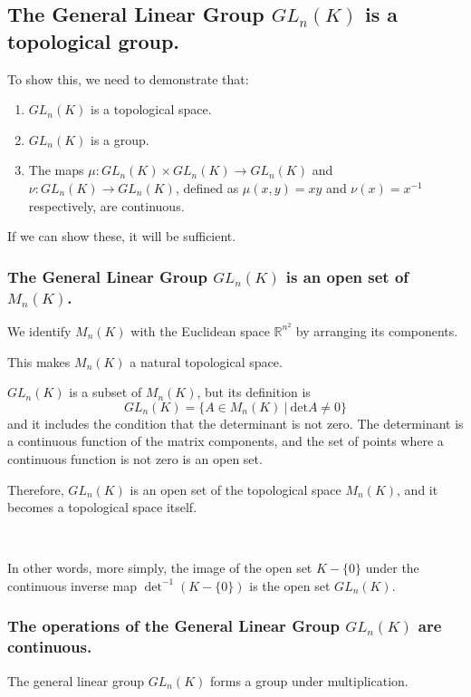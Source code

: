 \documentclass[uplatex,a4j,12pt,dvipdfmx]{jsarticle}
\begin{document}
\subsection{\textbf{The General Linear Group $GL_{n}(K)$ is a topological group.}}



To show this, we need to demonstrate that:

\begin{enumerate}
	\item $GL_{n}(K)$ is a topological space.
	\item $GL_{n}(K)$ is a group.
	\item The maps $\mu: GL_{n}(K) \times GL_{n}(K) \to GL_{n}(K)$ and $\nu: GL_{n}(K) \to GL_{n}(K)$, defined as $\mu(x,y)=xy$ and $\nu(x) = x^{-1}$ respectively, are continuous.
\end{enumerate}
If we can show these, it will be sufficient.


\subsubsection{\textbf{The General Linear Group $GL_{n}(K)$ is an open set of $M_{n}(K)$.}}

We identify $M_{n}(K)$ with the Euclidean space $\mathbb{R}^{n^{2}}$ by arranging its components.

This makes $M_{n}(K)$ a natural topological space.

$GL_{n} (K)$ is a subset of $M_{n} (K)$, but its definition is
$$
	GL_{n}(K) = \{ A \in M_{n}(K) \ | \ \text{det} A \neq 0 \}
$$
and it includes the condition that the determinant is not zero.
The determinant is a continuous function of the matrix components, and the set of points where a continuous function is not zero is an open set.

Therefore, $GL_{n}(K)$ is an open set of the topological space $M_{n}(K)$, and it becomes a topological space itself.


\ \ 


In other words, more simply, the image of the open set $K - \{0\}$ under the continuous inverse map $\det^{-1} (K - \{0\})$ is the open set $GL_{n}(K)$.

\subsubsection{\textbf{The operations of the General Linear Group $GL_{n}(K)$ are continuous.}}

The general linear group $GL_{n}(K)$ forms a group under multiplication.
\end{document}
